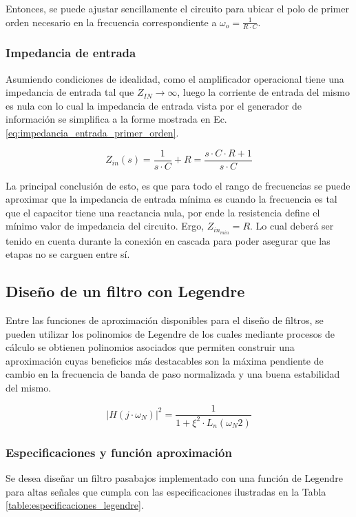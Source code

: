 Entonces, se puede ajustar sencillamente el circuito para ubicar el polo de primer orden necesario en la frecuencia correspondiente a $\omega_o = \frac{1}{R \cdot C}$.

\subsubsection{Impedancia de entrada}
Asumiendo condiciones de idealidad, como el amplificador operacional tiene una impedancia de entrada tal que $Z_{IN} \rightarrow \infty$, luego la corriente de entrada del mismo es nula
con lo cual la impedancia de entrada vista por el generador de informaci\'on se simplifica a la forme mostrada en Ec. \ref{eq:impedancia_entrada_primer_orden}.

\begin{equation}
Z_{in}(s) = \frac{1}{s \cdot C} + R = \frac{s \cdot C \cdot R + 1}{s \cdot C}
\label{eq:impedancia_entrada_primer_orden}
\end{equation}

La principal conclusi\'on de esto, es que para todo el rango de frecuencias se puede aproximar que la impedancia de entrada m\'inima es cuando la frecuencia es tal que el capacitor
tiene una reactancia nula, por ende la resistencia define el m\'inimo valor de impedancia del circuito. Ergo, $Z_{in_{min}} = R$. Lo cual deber\'a ser tenido en cuenta durante la conexi\'on
en cascada para poder asegurar que las etapas no se carguen entre s\'i.

\subsection{Dise\~no de un filtro con Legendre}
Entre las funciones de aproximaci\'on disponibles para el dise\~no de filtros, se pueden utilizar los polinomios de Legendre de los cuales
mediante procesos de c\'alculo se obtienen polinomios asociados que permiten construir una aproximaci\'on cuyas beneficios m\'as destacables son la m\'axima pendiente
de cambio en la frecuencia de banda de paso normalizada y una buena estabilidad del mismo.

\begin{equation}
|H(j \cdot \omega_N)|^{2} = \frac{1}{1 + \xi^{2} \cdot L_n(\omega_N{2})}
\end{equation}

\subsubsection{Especificaciones y funci\'on aproximaci\'on}
Se desea dise\~nar un filtro pasabajos implementado con una funci\'on de Legendre para altas se\~nales que cumpla con las especificaciones
ilustradas en la Tabla \ref{table:especificaciones_legendre}.

